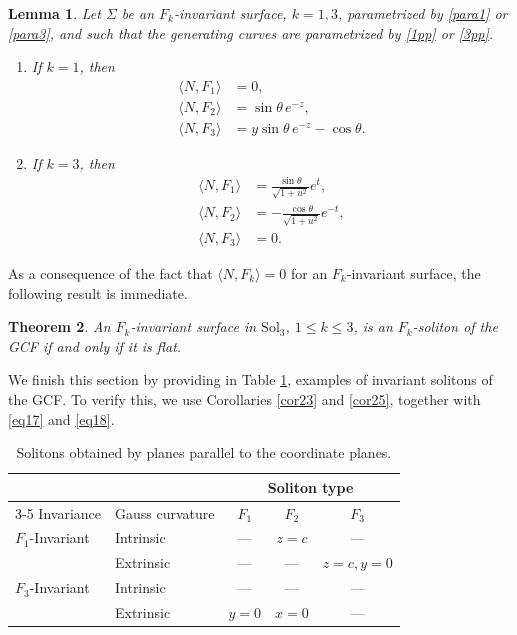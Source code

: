 \documentclass[a4paper,12pt]{amsart}
\theoremstyle{plain}
\newtheorem{theorem}{Theorem}[section]
\newtheorem{lemma}[theorem]{Lemma}
\theoremstyle{definition}
\def\sol{\text{Sol}_3}
\begin{document}
\begin{lemma} Let $\Sigma$ be an $F_k$-invariant surface, $k=1,3$, parametrized by \eqref{para1} or \eqref{para3}, and such that the generating curves are parametrized by \eqref{1pp} or \eqref{3pp}.
\begin{enumerate}
\item If $k=1$, then 
 \begin{equation}\label{eq17}
 \begin{split}
 \langle N,F_1\rangle&=0,\\
 \langle N,F_2\rangle&=\sin\theta\, e^{-z},\\
 \langle N,F_3\rangle&=y\sin\theta\, e^{-z}-\cos\theta.
 \end{split}
 \end{equation}
\item If $k=3$, then
 \begin{equation}\label{eq18}
 \begin{split}
 \langle N,F_1\rangle&=\frac{\sin\theta}{\sqrt{1+u^2}} e^t,\\
 \langle N,F_2\rangle&=-\frac{\cos\theta}{\sqrt{1+u^2}} e^{-t},\\
 \langle N,F_3\rangle&=0.
 \end{split}
 \end{equation}
\end{enumerate}
\end{lemma} 
 
As a consequence of the fact that $\langle N,F_k \rangle=0$ for an $F_k$-invariant surface, the following result is immediate. 
 
 \begin{theorem}\label{t34}
An $F_k$-invariant surface in $\sol$, $1\leq k\leq 3$, is an $F_k$-soliton of the GCF if and only if it is flat. 
\end{theorem}
 
We finish this section by providing in Table \ref{ex1}, examples of invariant solitons of the GCF. To verify this, we use Corollaries \ref{cor23} and \ref{cor25}, together with \eqref{eq17} and \eqref{eq18}.
 

 \begin{table}[h]
\centering

\begin{tabular}{@{}llccc@{}}
\toprule
 & & \multicolumn{3}{c}{ Soliton type } \\ \cmidrule(l){3-5} 
Invariance & Gauss curvature & $F_1$ & $F_2$ & $F_3$ \\ \midrule
 {$F_1$-Invariant} & Intrinsic & --- & $z=c$ & --- \\
 & Extrinsic & --- & --- & $z=c, y=0$ \\ \addlinespace
 {$F_3$-Invariant} & Intrinsic & --- & --- & --- \\
 & Extrinsic & $y=0$ & $x=0$ & --- \\ \bottomrule
\end{tabular}
\caption{Solitons obtained by planes parallel to the coordinate planes. }\label{ex1}
\end{table}
\end{document}
